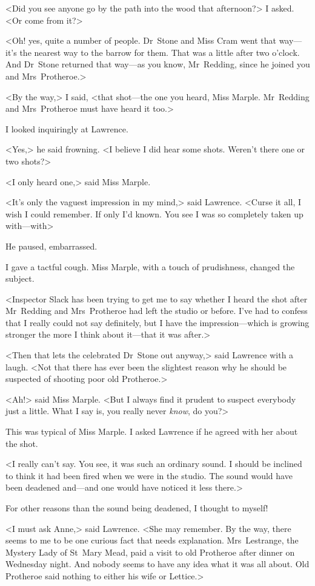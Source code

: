 <Did you see anyone go by the path into the wood that afternoon?> I asked. <Or come from it?>

<Oh! yes, quite a number of people. Dr~Stone and Miss Cram went that way—it's the nearest way to the barrow for them. That was a little after two o'clock. And Dr~Stone returned that way—as you know, Mr~Redding, since he joined you and Mrs~Protheroe.>

<By the way,> I said, <that shot—the one you heard, Miss Marple. Mr~Redding and Mrs~Protheroe must have heard it too.>

I looked inquiringly at Lawrence.

<Yes,> he said frowning. <I believe I did hear some shots. Weren't there one or two shots?>

<I only heard one,> said Miss Marple.

<It's only the vaguest impression in my mind,> said Lawrence. <Curse it all, I wish I could remember. If only I'd known. You see I was so completely taken up with—with\longdash>

He paused, embarrassed.

I gave a tactful cough. Miss Marple, with a touch of prudishness, changed the subject.

<Inspector Slack has been trying to get me to say whether I heard the shot after Mr~Redding and Mrs~Protheroe had left the studio or before. I've had to confess that I really could not say definitely, but I have the impression—which is growing stronger the more I think about it—that it was after.>

<Then that lets the celebrated Dr~Stone out anyway,> said Lawrence with a laugh. <Not that there has ever been the slightest reason why he should be suspected of shooting poor old Protheroe.>

<Ah!> said Miss Marple. <But I always find it prudent to suspect everybody just a little. What I say is, you really never \emph{know}, do you?>

This was typical of Miss Marple. I asked Lawrence if he agreed with her about the shot.

<I really can't say. You see, it was such an ordinary sound. I should be inclined to think it had been fired when we were in the studio. The sound would have been deadened and—and one would have noticed it less there.>

For other reasons than the sound being deadened, I thought to myself!

<I must ask Anne,> said Lawrence. <She may remember. By the way, there seems to me to be one curious fact that needs explanation. Mrs~Lestrange, the Mystery Lady of St~Mary Mead, paid a visit to old Protheroe after dinner on Wednesday night. And nobody seems to have any idea what it was all about. Old Protheroe said nothing to either his wife or Lettice.>

